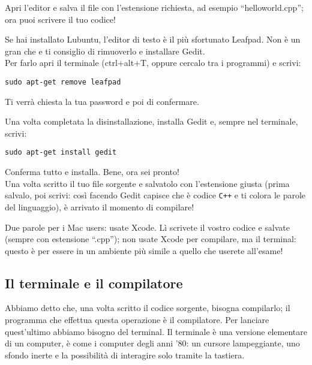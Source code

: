 Apri l'editor e salva il file con l'estensione richiesta, ad esempio ``helloworld.cpp''; ora puoi scrivere il tuo codice! 

Se hai installato Lubuntu, l'editor di testo è il più sfortunato Leafpad. Non è un gran che e ti consiglio di rimuoverlo e installare Gedit. 
\\Per farlo apri il terminale (ctrl+alt+T, oppure cercalo tra i programmi) e scrivi:
	\begin{shaded}
		\begin{minipage}{\textwidth}
			\begin{verbatim}
sudo apt-get remove leafpad
			\end{verbatim}%
		\end{minipage}
	\end{shaded}
	Ti verrà chiesta la tua password e poi di confermare. 
	
	Una volta completata la disinstallazione, installa Gedit e, sempre nel terminale, scrivi:
	
	\begin{shaded}
		\begin{minipage}{\textwidth}
			\begin{verbatim}
sudo apt-get install gedit
			\end{verbatim}%
		\end{minipage}
	\end{shaded}
Conferma tutto e installa. Bene, ora sei pronto!
\\

Una volta scritto il tuo file sorgente e salvatolo con l'estensione giusta (prima salvalo, poi scrivi: così facendo Gedit capisce che è codice \verb|C++| e ti colora le parole del linguaggio), è arrivato il momento di compilare!

Due parole per i Mac users: usate Xcode. Lì scrivete il vostro codice e salvate (sempre con estensione ``.cpp''); non usate Xcode per compilare, ma il terminal: questo è per essere in un ambiente più simile a quello che userete all'esame!

\subsection{Il terminale e il compilatore}
Abbiamo detto che, una volta scritto il codice sorgente, bisogna compilarlo; il programma che effettua questa operazione è il compilatore. Per lanciare quest'ultimo abbiamo bisogno del terminal. Il terminale è una versione elementare di un computer, è come i computer degli anni '80: un cursore lampeggiante, uno sfondo inerte e la possibilità di interagire solo tramite la tastiera. 

